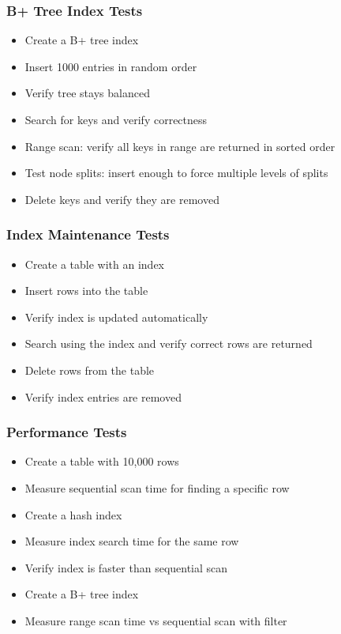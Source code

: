 \documentclass[11pt,a4paper]{article}
\begin{document}
\subsubsection{B+ Tree Index Tests}

\begin{itemize}
\item Create a B+ tree index
\item Insert 1000 entries in random order
\item Verify tree stays balanced
\item Search for keys and verify correctness
\item Range scan: verify all keys in range are returned in sorted order
\item Test node splits: insert enough to force multiple levels of splits
\item Delete keys and verify they are removed
\end{itemize}

\subsubsection{Index Maintenance Tests}

\begin{itemize}
\item Create a table with an index
\item Insert rows into the table
\item Verify index is updated automatically
\item Search using the index and verify correct rows are returned
\item Delete rows from the table
\item Verify index entries are removed
\end{itemize}

\subsubsection{Performance Tests}

\begin{itemize}
\item Create a table with 10,000 rows
\item Measure sequential scan time for finding a specific row
\item Create a hash index
\item Measure index search time for the same row
\item Verify index is faster than sequential scan
\item Create a B+ tree index
\item Measure range scan time vs sequential scan with filter
\end{itemize}
\end{document}

